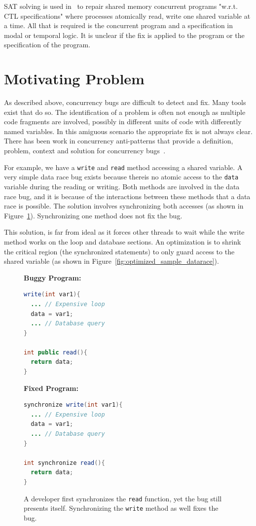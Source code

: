 \documentclass[10pt, conference, compsocconf]{IEEEtran}
\begin{document}
SAT solving is used in~\cite{AY07}  to repair shared memory concurrent programs
"w.r.t. CTL specifications" where processes atomically read, write one shared
variable at a time. All that is required is the concurrent program and a 
specification in modal or temporal logic. It is unclear if the fix is applied to
the program or the specification of the program.

\section{Motivating Problem}
\label{sec:motivation}

As described above, concurrency bugs are difficult to detect and fix. Many
tools exist that do so. The identification of a problem is often not enough
as multiple code fragments are involved, possibly in different units of code
with differently named variables. In this amiguous scenario the appropriate
fix is not always clear. There has been work in concurrency anti-patterns
that provide a definition, problem, context and solution for concurrency
bugs~\cite{BJ09}.

For example, we have a \texttt{write} and \texttt{read} method accessing a
shared variable. A very simple data race bug exists because thereis no atomic
access to the \texttt{data} variable during the reading or writing. Both
methods are involved in the data race bug, and it is because of the
interactions between these methods that a data race is possible. The solution
involves synchronizing both accesses (as shown in
Figure~\ref{fig:fixed_sample_datarace}). Synchronizing one method does not fix
the bug.

This solution, is far from ideal as it forces other threads to wait while the
write method works on the loop and database sections. An optimization is to
shrink the critical region (the synchronized statements) to only guard access
to the shared variable (as shown in
Figure~\ref{fig:optimized_sample_datarace}).

\begin{figure}[!h]
\vspace{2mm}
\begin{minipage}{3.70cm}
\footnotesize{\textbf{Buggy Program:}}
\begin{lstlisting}[language=Java]
write(int var1){
  ... // Expensive loop
  data = var1;
  ... // Database query
}

int public read(){
  return data;
}
\end{lstlisting}
\end{minipage}\hfill
\begin{minipage}{3.70cm}
\footnotesize{\textbf{Fixed Program:}}
\begin{lstlisting}[language=Java]
synchronize write(int var1){
  ... // Expensive loop
  data = var1;
  ... // Database query
}

int synchronize read(){
  return data;
}
\end{lstlisting}
\end{minipage}
\caption{A developer first synchronizes the \texttt{read} function, yet the bug
still presents itself. Synchronizing the \texttt{write} method as well fixes
the bug.}
\label{fig:fixed_sample_datarace}
\end{figure}
\end{document}
